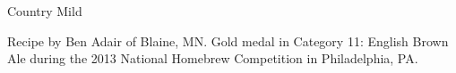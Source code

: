 \begin{recipe}{Country Mild} %

\begin{aboutblock}
Recipe by Ben Adair of Blaine, MN. Gold medal in Category 11: English Brown Ale
during the 2013 National Homebrew Competition in Philadelphia, PA.
\sourceaha
\end{aboutblock}


\begin{methodandtiming}

\begin{mashsteps}
\end{mashsteps}

\begin{fermentationsteps}
\end{fermentationsteps}

\end{methodandtiming}

\recipebreak

\begin{ingredientsblock}

\begin{malts}

\end{malts}

\begin{hops}
\end{hops}


\end{ingredientsblock}

\end{recipe}

